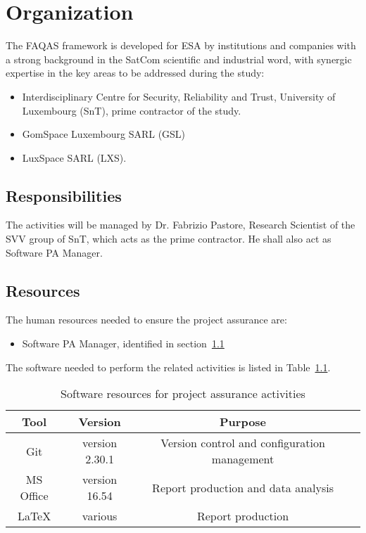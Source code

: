\chapter{Organization}
\label{chapter:organization}


The FAQAS framework is developed for ESA by institutions and companies with a strong background in the SatCom
scientific and industrial word, with synergic expertise in the key areas to be addressed during
the study:
\begin{itemize}
  \item Interdisciplinary Centre for Security, Reliability and Trust, University of Luxembourg (SnT), prime contractor of the study.
  \item GomSpace Luxembourg SARL (GSL)
  \item LuxSpace SARL (LXS).
\end{itemize}

\section{Responsibilities}
\label{sec:resp}

The activities will be managed by Dr. Fabrizio Pastore, Research Scientist of the SVV group of SnT, which acts as the prime contractor.
He shall also act as Software PA Manager.

\section{Resources}
\label{sec:resources}

The human resources needed to ensure the project assurance are:
\begin{itemize}
  \item Software PA Manager, identified in section~\ref{sec:resp}%
\end{itemize}

The software needed to perform the related activities is listed in Table~\ref{table:software_resources}.

\begin{table}[H]
\centering
\begin{tabular}{||c|c|c|c||}
 \hline
 \textbf{Tool} & \textbf{Version} & \textbf{Purpose}\\
 \hline
 Git & version 2.30.1 & Version control and configuration management \\
 MS Office & version 16.54 & Report production and data analysis \\
 LaTeX & various & Report production \\
 \hline
\end{tabular}
\caption{Software resources for project assurance activities}
\label{table:software_resources}
\end{table}

